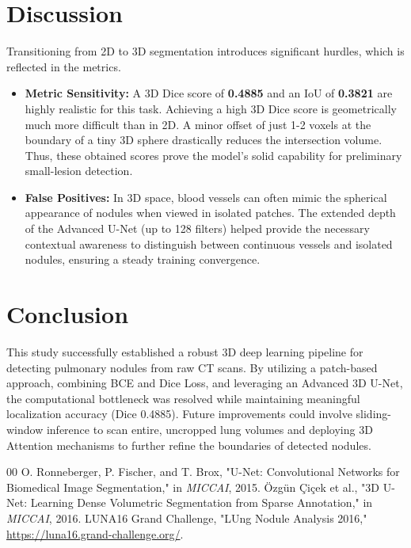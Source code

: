 \documentclass[conference]{IEEEtran}
\begin{document}
\section{Discussion}
Transitioning from 2D to 3D segmentation introduces significant hurdles, which is reflected in the metrics.
\begin{itemize}
    \item \textbf{Metric Sensitivity:} A 3D Dice score of \textbf{0.4885} and an IoU of \textbf{0.3821} are highly realistic for this task. Achieving a high 3D Dice score is geometrically much more difficult than in 2D. A minor offset of just 1-2 voxels at the boundary of a tiny 3D sphere drastically reduces the intersection volume. Thus, these obtained scores prove the model's solid capability for preliminary small-lesion detection.
    \item \textbf{False Positives:} In 3D space, blood vessels can often mimic the spherical appearance of nodules when viewed in isolated patches. The extended depth of the Advanced U-Net (up to 128 filters) helped provide the necessary contextual awareness to distinguish between continuous vessels and isolated nodules, ensuring a steady training convergence.
\end{itemize}

\section{Conclusion}
This study successfully established a robust 3D deep learning pipeline for detecting pulmonary nodules from raw CT scans. By utilizing a patch-based approach, combining BCE and Dice Loss, and leveraging an Advanced 3D U-Net, the computational bottleneck was resolved while maintaining meaningful localization accuracy (Dice 0.4885). Future improvements could involve sliding-window inference to scan entire, uncropped lung volumes and deploying 3D Attention mechanisms to further refine the boundaries of detected nodules.

\begin{thebibliography}{00}
 O. Ronneberger, P. Fischer, and T. Brox, "U-Net: Convolutional Networks for Biomedical Image Segmentation," in \textit{MICCAI}, 2015.
 Özgün Çiçek et al., "3D U-Net: Learning Dense Volumetric Segmentation from Sparse Annotation," in \textit{MICCAI}, 2016.
 LUNA16 Grand Challenge, "LUng Nodule Analysis 2016," \url{https://luna16.grand-challenge.org/}.
\end{thebibliography}
\end{document}
